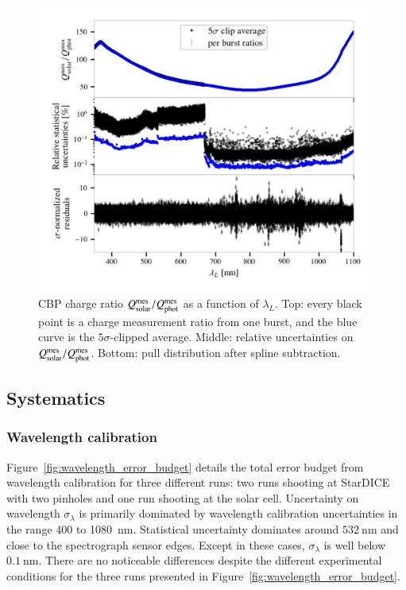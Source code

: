 \begin{figure}[!h]
\centering
\includegraphics[width=\columnwidth]{fig/cbp_charge_ratio.png}
\caption{CBP charge ratio $Q_{\mathrm{solar}}^{\mathrm{mes}}/Q_{\mathrm{phot}}^{\mathrm{mes}}$ as a function of $\lambda_L$. Top: every black point is a charge measurement ratio from one burst, and the blue curve is the $5\sigma$-clipped average. Middle: relative uncertainties on $Q_{\mathrm{solar}}^{\mathrm{mes}}/Q_{\mathrm{phot}}^{\mathrm{mes}}$. Bottom: pull distribution after spline subtraction.}\label{fig:cbp_charge_ratio}
\end{figure}


\subsection{Systematics}



\subsubsection{Wavelength calibration}\label{sec:wavelength_syst}


Figure~\ref{fig:wavelength_error_budget} details the total error budget from wavelength calibration for three different runs: two runs shooting at StarDICE with two pinholes and one run shooting at the solar cell. Uncertainty on wavelength $\sigma_\lambda$ is primarily dominated by wavelength calibration uncertainties in the range 400 to \SI{1080}{\nm}. Statistical uncertainty dominates around $\SI{532}{\nm}$ and close to the spectrograph sensor edges. Except in these cases, $\sigma_\lambda$ is well below $\SI{0.1}{\nano\meter}$. There are no noticeable differences despite the different experimental conditions for the three runs presented in Figure~\ref{fig:wavelength_error_budget}.

